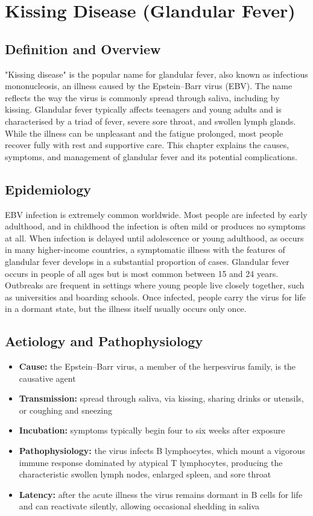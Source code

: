 \chapter{Kissing Disease (Glandular Fever)}

\section*{Definition and Overview}
"Kissing disease" is the popular name for glandular fever, also known as infectious mononucleosis, an illness caused by the Epstein--Barr virus (EBV). The name reflects the way the virus is commonly spread through saliva, including by kissing. Glandular fever typically affects teenagers and young adults and is characterised by a triad of fever, severe sore throat, and swollen lymph glands. While the illness can be unpleasant and the fatigue prolonged, most people recover fully with rest and supportive care. This chapter explains the causes, symptoms, and management of glandular fever and its potential complications.

\section*{Epidemiology}
EBV infection is extremely common worldwide. Most people are infected by early adulthood, and in childhood the infection is often mild or produces no symptoms at all. When infection is delayed until adolescence or young adulthood, as occurs in many higher-income countries, a symptomatic illness with the features of glandular fever develops in a substantial proportion of cases. Glandular fever occurs in people of all ages but is most common between 15 and 24 years. Outbreaks are frequent in settings where young people live closely together, such as universities and boarding schools. Once infected, people carry the virus for life in a dormant state, but the illness itself usually occurs only once.

\section*{Aetiology and Pathophysiology}
\begin{itemize}
    \item \textbf{Cause:} the Epstein--Barr virus, a member of the herpesvirus family, is the causative agent
    \item \textbf{Transmission:} spread through saliva, via kissing, sharing drinks or utensils, or coughing and sneezing
    \item \textbf{Incubation:} symptoms typically begin four to six weeks after exposure
    \item \textbf{Pathophysiology:} the virus infects B lymphocytes, which mount a vigorous immune response dominated by atypical T lymphocytes, producing the characteristic swollen lymph nodes, enlarged spleen, and sore throat
    \item \textbf{Latency:} after the acute illness the virus remains dormant in B cells for life and can reactivate silently, allowing occasional shedding in saliva
\end{itemize}

